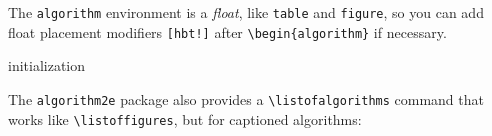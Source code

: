 \documentclass[11pt]{article}
\begin{document}
The \verb|algorithm| environment is a \emph{float}, like \verb|table| and \verb|figure|, so you can add float placement modifiers \verb|[hbt!]| after \verb|\begin{algorithm}| if necessary.

\begin{algorithm}
\caption{Another algorithm with caption}\label{alg:three}
 initialization\;
\end{algorithm}

The \verb|algorithm2e| package also provides a \verb|\listofalgorithms| command that works like \verb|\listoffigures|, but for captioned algorithms:

\listofalgorithms
\end{document}
